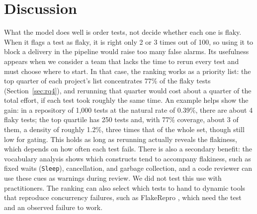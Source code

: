 \section{Discussion}
\label{sec:discussion}

 What the model does well is order tests, not decide whether each one is flaky. When it flags a test as flaky, it is right only 2 or 3 times out of 100, so using it to block a delivery in the pipeline would raise too many false alarms. Its usefulness appears when we consider a team that lacks the time to rerun every test and must choose where to start. In that case, the ranking works as a priority list: the top quarter of each project's list concentrates 77\% of the flaky tests (Section~\ref{sec:rq4}), and rerunning that quarter would cost about a quarter of the total effort, if each test took roughly the same time. An example helps show the gain: in a repository of 1,000 tests at the natural rate of 0.39\%, there are about 4 flaky tests; the top quartile has 250 tests and, with 77\% coverage, about 3 of them, a density of roughly 1.2\%, three times that of the whole set, though still low for gating.  This holds as long as rerunning actually reveals the flakiness, which depends on how often each test fails. There is also a secondary benefit: the vocabulary analysis shows which constructs tend to accompany flakiness, such as fixed waits (\texttt{Sleep}), cancellation, and garbage collection, and a code reviewer can use these cues as warnings during review. We did not test this use with practitioners. The ranking can also select which tests to hand to dynamic tools that reproduce concurrency failures, such as FlakeRepro \cite{leesatapornwongsa2022flakerepro}, which need the test and an observed failure to work.

